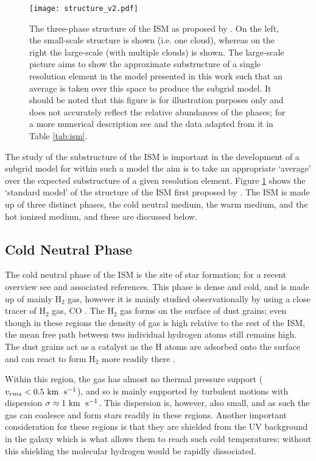 \begin{figure}[ht]
    \centering

    \texttt{[image: structure\_v2.pdf]}

    \caption{The three-phase structure of the ISM as proposed by \citet{mckee_theory_1977}.
        On the left, the small-scale structure is shown (i.e. one cloud), whereas on the right the large-scale (with multiple clouds) is shown.
        The large-scale picture aims to show the approximate substructure of a single resolution element in the model presented in this work such that an average is taken over this space to produce the subgrid model.
    It should be noted that this figure is for illustration purposes only and does not accurately reflect the relative abundances of the phases; for a more numerical description see \citet{ferriere_interstellar_2001} and the data adapted from it in Table \ref{tab:ism}.}
    \label{fig:struct}
\end{figure}

The study of the substructure of the ISM is important in the development of a subgrid model for within such a model the aim is to take an appropriate `average' over the expected substructure of a given resolution element.
Figure \ref{fig:struct} shows the `standard model' of the structure of the ISM first proposed by \citet{mckee_theory_1977}.
The ISM is made up of three distinct phases, the cold neutral medium, the warm medium, and the hot ionized medium, and these are discussed below.

\subsection{Cold Neutral Phase}

The cold neutral phase of the ISM is the site of star formation; for a recent overview see \citet{mckee_theory_2008} and associated references.
This phase is dense and cold, and is made up of mainly H$_2$ gas, however it is mainly studied observationally by using a close tracer of H$_2$ gas, CO \citep{ferriere_interstellar_2001}.
The H$_2$ gas forms on the surface of dust grains; even though in these regions the density of gas is high relative to the rest of the ISM, the mean free path between two individual hydrogen atoms still remains high.
The dust grains act as a catalyst as the H atoms are adsorbed onto the surface and can react to form H$_2$ more readily there \citep{gould_interstellar_1963}.

Within this region, the gas has almost no thermal pressure support ($v_{rms} < 0.5 ~\mathrm{km}\;~\mathrm{s}^{-1}$), and so is mainly supported by turbulent motions \citep{larson_turbulence_1981, solomon_mass_1987, heyer_universality_2004} with dispersion $\sigma \approx 1 ~\mathrm{km}\;~\mathrm{s}^{-1}$.
This dispersion is, however, also small, and as such the gas can coalesce and form stars readily in these regions.
Another important consideration for these regions is that they are shielded from the UV background in the galaxy which is what allows them to reach such cold temperatures; without this shielding the molecular hydrogen would be rapidly dissociated. 

